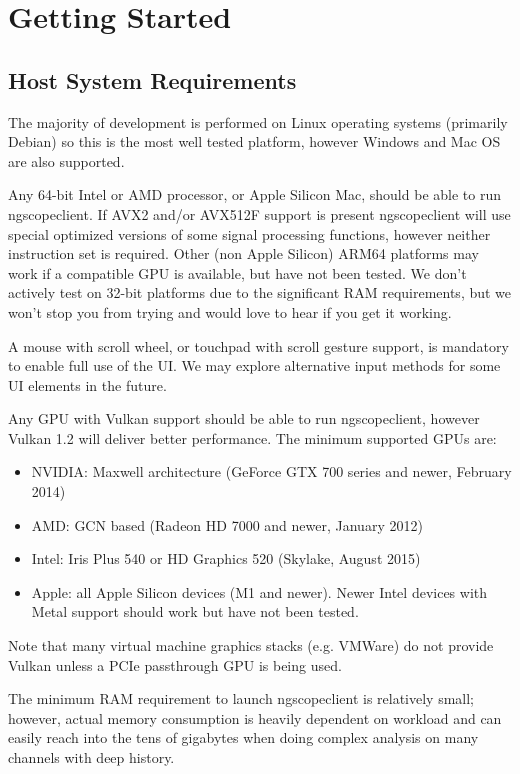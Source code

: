 \chapter{Getting Started}

\section{Host System Requirements}

The majority of development is performed on Linux operating systems (primarily Debian) so this is the most well
tested platform, however Windows and Mac OS are also supported.

Any 64-bit Intel or AMD processor, or Apple Silicon Mac, should be able to run ngscopeclient. If AVX2 and/or AVX512F
support is present ngscopeclient will use special optimized versions of some signal processing functions, however
neither instruction set is required. Other (non Apple Silicon) ARM64 platforms may work if a compatible GPU is
available, but have not been tested. We don't actively test on 32-bit platforms due to the significant RAM
requirements, but we won't stop you from trying and would love to hear if you get it working.

A mouse with scroll wheel, or touchpad with scroll gesture support, is mandatory to enable full use of the UI. We may
explore alternative input methods for some UI elements in the future.

Any GPU with Vulkan support should be able to run ngscopeclient, however Vulkan 1.2 will deliver better performance.
The minimum supported GPUs are:
\begin{itemize}
\item NVIDIA: Maxwell architecture (GeForce GTX 700 series and newer, February 2014)
\item AMD: GCN based (Radeon HD 7000 and newer, January 2012)
\item Intel: Iris Plus 540 or HD Graphics 520 (Skylake, August 2015)
\item Apple: all Apple Silicon devices (M1 and newer). Newer Intel devices with Metal support should work but have not
been tested.
\end{itemize}

Note that many virtual machine graphics stacks (e.g. VMWare) do not provide Vulkan unless a PCIe passthrough GPU is
being used.

The minimum RAM requirement to launch ngscopeclient is relatively small; however, actual memory consumption is
heavily dependent on workload and can easily reach into the tens of gigabytes when doing complex analysis on many
channels with deep history.

